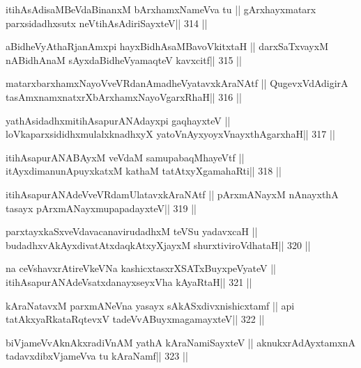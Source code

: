 \begin{shl}
itihAsAdisaMBeVdaBinanxM bArxhamxNameVva tu ||
gArxhayxmatarx parxsidadhxsutx neVtihAsAdiriSayxteV\hfill || 314 ||
\end{shl}

\begin{shl}
aBidheVyAthaRjanAmxpi hayxBidhAsaMBavoVkitxtaH ||
darxSaTxvayxM nABidhAnaM sAyxdaBidheVyamaqteV kavxcitf\hfill || 315 ||
\end{shl}

\begin{shl}
matarxbarxhamxNayoVveVRdanAmadheVyatavxkAraNAtf ||
QugevxVdAdigirA tasAmxnamxnatxrXbArxhamxNayoVgarxRhaH\hfill || 316 ||
\end{shl}

\begin{shl}
yathAsidadhxmitihAsapurANAdayxpi gaqhayxteV ||
loVkaparxsididhxmulalxknadhxyX yatoV\s nAyxyoyxV\s nayxthAgarxhaH\hfill || 317 ||
\end{shl}

\begin{shl}
itihAsapurANABAyxM veVdaM samupabaqMhayeVtf ||
itAyxdimanunA\s puyxkatxM kathaM tatAtxyXgamahaRti\hfill || 318 ||
\end{shl}

\begin{shl}
itihAsapurANAdeVveVRdamUlatavxkAraNAtf ||
pArxmANayxM nAnayxthA tasayx pArxmANayxmupapadayxteV\hfill || 319 ||
\end{shl}

\begin{shl}
parxtayxkaSxveVdavacanavirudadhxM teVSu yadavxcaH ||
budadhxvAkAyxdivatAtxdaqkAtxyXjayxM shurxtiviroVdhataH\hfill || 320 ||
\end{shl}

\begin{shl}
na ceVshavxrAtireVkeVNa kashicxtasxrXSATx\s BuyxpeVyateV ||
itihAsapurANAdeVsatxdanayxseyxVha kAyaRtaH\hfill || 321 ||
\end{shl}

\begin{shl}
kAraNatavxM parxmANeVna yasayx sAkASxdivxnishicxtamf ||
api tatAkxyaRkataRqtevxV tadeVvABuyxmagamayxteV\hfill || 322 ||
\end{shl}

\begin{shl}
biVjameVvAknAkxradiVnAM yathA kAraNamiSayxteV ||
aknukxrAdAyxtamxnA tadavxdibxVjameVva tu kAraNamf\hfill || 323 ||
\end{shl}

